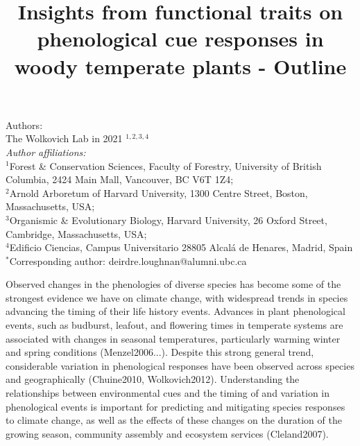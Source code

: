\documentclass{article}\usepackage[]{graphicx}\usepackage[]{color}
\title{Insights from functional traits on phenological cue responses in woody temperate plants - Outline}
\begin{document}
\maketitle

\noindent Authors:\\
The Wolkovich Lab in 2021 $^{1,2,3,4}$
\vspace{2ex}\\
\emph{Author affiliations:}\\
$^{1}$Forest \& Conservation Sciences, Faculty of Forestry, University of British Columbia, 2424 Main Mall, Vancouver, BC V6T 1Z4;\\
$^{2}$Arnold Arboretum of Harvard University, 1300 Centre Street, Boston, Massachusetts, USA;\\
$^{3}$Organismic \& Evolutionary Biology, Harvard University, 26 Oxford Street, Cambridge, Massachusetts, USA;\\
$^{4}$Edificio Ciencias, Campus Universitario 28805 Alcalá de Henares, Madrid, Spain\\
 

\vspace{2ex}
$^*$Corresponding author: deirdre.loughnan@alumni.ubc.ca\\
\renewcommand{\thetable}{\arabic{table}}
\renewcommand{\thefigure}{\arabic{figure}}
\renewcommand{\labelitemi}{$-$}

Observed changes in the phenologies of diverse species has become some of the strongest evidence we have on climate change, with widespread trends in species advancing the timing of their life history events. Advances in plant phenological events, such as budburst, leafout, and flowering times in temperate systems are associated with changes in seasonal temperatures, particularly warming winter and spring conditions (Menzel2006...). Despite this strong general trend, considerable variation in phenological responses have been observed across species and geographically (Chuine2010, Wolkovich2012). Understanding the relationships between environmental cues and the timing of and variation in phenological events is important for predicting and mitigating species responses to climate change, as well as the effects of these changes on the duration of the growing season, community assembly and ecosystem services (Cleland2007). 
\end{document}
